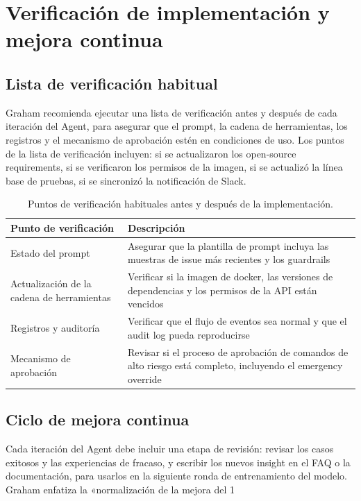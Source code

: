\documentclass[a4paper]{article}
\begin{document}
\section{Verificación de implementación y mejora continua}
\subsection{Lista de verificación habitual}
Graham recomienda ejecutar una lista de verificación antes y después de cada iteración del Agent, para asegurar que el prompt, la cadena de herramientas, los registros y el mecanismo de aprobación estén en condiciones de uso. Los puntos de la lista de verificación incluyen: si se actualizaron los open-source requirements, si se verificaron los permisos de la imagen, si se actualizó la línea base de pruebas, si se sincronizó la notificación de Slack.

\begin{table}[H]
\centering
\begin{tabular}{p{} p{}}
\toprule
Punto de verificación & Descripción \\
\midrule
Estado del prompt & Asegurar que la plantilla de prompt incluya las muestras de issue más recientes y los guardrails \\
\midrule
Actualización de la cadena de herramientas & Verificar si la imagen de docker, las versiones de dependencias y los permisos de la API están vencidos \\
\midrule
Registros y auditoría & Verificar que el flujo de eventos sea normal y que el audit log pueda reproducirse \\
\midrule
Mecanismo de aprobación & Revisar si el proceso de aprobación de comandos de alto riesgo está completo, incluyendo el emergency override \\
\bottomrule
\end{tabular}
\caption{Puntos de verificación habituales antes y después de la implementación.}
\end{table}

\subsection{Ciclo de mejora continua}
Cada iteración del Agent debe incluir una etapa de revisión: revisar los casos exitosos y las experiencias de fracaso, y escribir los nuevos insight en el FAQ o la documentación, para usarlos en la siguiente ronda de entrenamiento del modelo. Graham enfatiza la «normalización de la mejora del 1%
\end{document}
